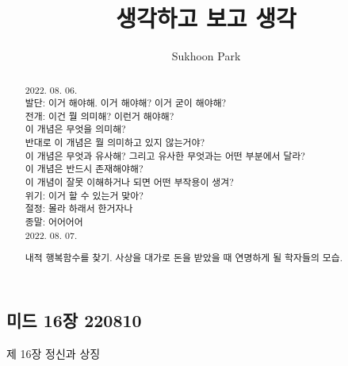 \documentclass[11pt, a4paper]{article}
\begin{document}
\title{생각하고 보고 생각}
\author{Sukhoon Park}
\maketitle

\begin{abstract}

2022. 08. 06. \\
발단: 이거 해야해. 이거 해야해? 이거 굳이 해야해? \\
전개: 이건 뭘 의미해? 이런거 해야해? \\
이 개념은 무엇을 의미해? \\
반대로 이 개념은 뭘 의미하고 있지 않는거야? \\
이 개념은 무엇과 유사해? 그리고 유사한 무엇과는 어떤 부분에서 달라? \\
이 개념은 반드시 존재해야해? \\
이 개념이 잘못 이해하거나 되면 어떤 부작용이 생겨? \\
위기: 이거 할 수 있는거 맞아? \\
절정: 몰라 하래서 한거자나 \\
종말: 어어어어 \\

2022. 08. 07.

내적 행복함수를 찾기. 사상을 대가로 돈을 받았을 때 연명하게 될 학자들의 모습. \\


\end{abstract}

\newpage
\subsection{미드 16장 220810}
제 16장 정신과 상징
\end{document}
